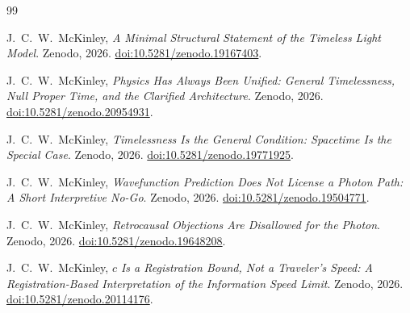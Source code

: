 \documentclass[12pt,onecolumn]{article}
\begin{document}
\begin{thebibliography}{99}

J.~C.~W.~McKinley,
\textit{A Minimal Structural Statement of the Timeless Light Model}.
Zenodo, 2026.
\href{https://doi.org/10.5281/zenodo.19167403}
{doi:10.5281/zenodo.19167403}.

J.~C.~W.~McKinley,
\textit{Physics Has Always Been Unified:
General Timelessness, Null Proper Time, and the Clarified Architecture}.
Zenodo, 2026.
\href{https://doi.org/10.5281/zenodo.20954931}
{doi:10.5281/zenodo.20954931}.

J.~C.~W.~McKinley,
\textit{Timelessness Is the General Condition:
Spacetime Is the Special Case}.
Zenodo, 2026.
\href{https://doi.org/10.5281/zenodo.19771925}
{doi:10.5281/zenodo.19771925}.

J.~C.~W.~McKinley,
\textit{Wavefunction Prediction Does Not License a Photon Path:
A Short Interpretive No-Go}.
Zenodo, 2026.
\href{https://doi.org/10.5281/zenodo.19504771}
{doi:10.5281/zenodo.19504771}.

J.~C.~W.~McKinley,
\textit{Retrocausal Objections Are Disallowed for the Photon}.
Zenodo, 2026.
\href{https://doi.org/10.5281/zenodo.19648208}
{doi:10.5281/zenodo.19648208}.

J.~C.~W.~McKinley,
\textit{$c$ Is a Registration Bound, Not a Traveler's Speed:
A Registration-Based Interpretation of the Information Speed Limit}.
Zenodo, 2026.
\href{https://doi.org/10.5281/zenodo.20114176}
{doi:10.5281/zenodo.20114176}.

\end{thebibliography}
\end{document}
